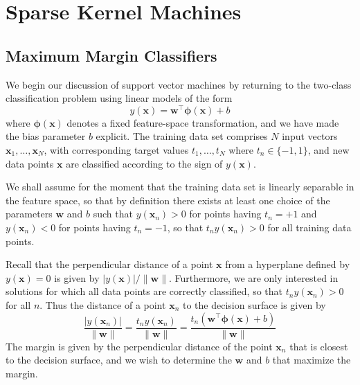 \documentclass[12pt]{article}
\newcommand{\x}{\mathbf{x}}
\newcommand{\w}{\mathbf{w}}
\newcommand{\yOfX}{y\left(\x\right)}
\newcommand{\yOfXn}{y\left(\x_n\right)}
\newcommand{\phiOfX}{\mathbf{\phi}\left(\x\right)}
\begin{document}
\section{Sparse Kernel Machines}
\subsection{Maximum Margin Classifiers}

We begin our discussion of support vector machines by returning to the two-class
classification problem using linear models of the form
%
\begin{equation*}
  \yOfX = \w^\top\phiOfX + b
\end{equation*}
%
where $\phiOfX$ denotes a fixed feature-space transformation, and we have made
the bias parameter $b$ explicit. The training data set comprises $N$ input
vectors $\x_1,\hdots,\x_N$, with corresponding target values $t_1,\hdots,t_N$
where $t_n \in \{-1, 1\}$, and new data points $\x$ are classified
according to the sign of $\yOfX$.

We shall assume for the moment that the training data set is linearly separable
in the feature space, so that by definition there exists at least one choice of
the parameters $\w$ and $b$ such that $\yOfXn > 0$ for points having $t_n = +1$
and $\yOfXn < 0$ for points having $t_n = -1$, so that $t_n\yOfXn > 0$ for all
training data points.

Recall that the perpendicular distance of a point $\x$ from a hyperplane defined
by $\yOfX = 0$ is given by $|\yOfX|/\|\w\|$. Furthermore, we are only interested
in solutions for which all data points are correctly classified, so that
$t_n\yOfXn > 0$ for all $n$. Thus the distance of a point $\x_n$ to the decision
surface is given by
%
\begin{equation*}
  \frac{|\yOfXn|}{\|\w\|} =
  \frac{t_n\yOfXn}{\|\w\|} =
  \frac{t_n\left(\w^\top\phiOfX + b\right)}{\|\w\|}
\end{equation*}
%
The margin is given by the perpendicular distance of the point $\x_n$ that is
closest to the decision surface, and we wish to determine the $\w$ and $b$ that
maximize the margin.
\end{document}
